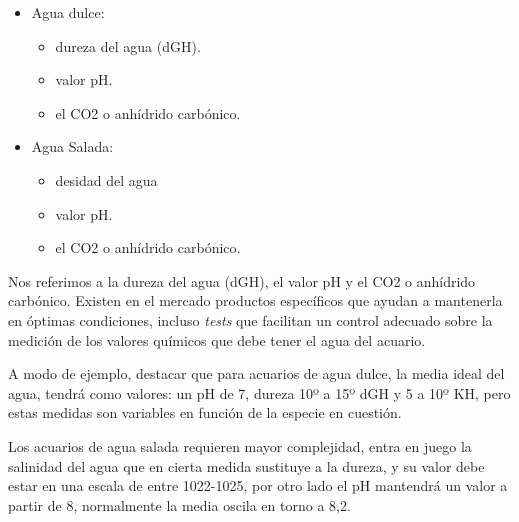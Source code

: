 \begin{itemize}
\item Agua dulce:
	\begin{itemize}
		\item dureza del agua (dGH).
		\item valor pH.
		\item el CO2  o anhídrido carbónico.
	\end{itemize}
	\vspace{5px}
	\item Agua Salada:
	\begin{itemize}
		\item desidad del agua
		\item valor pH.
		\item el CO2  o anhídrido carbónico.
	\end{itemize}
	
\end{itemize}
Nos referimos a la dureza del agua (dGH), el valor pH y el CO2  o anhídrido carbónico. Existen en el mercado productos específicos que ayudan a mantenerla en óptimas condiciones, incluso \textit{tests} que facilitan un control adecuado sobre la medición de los valores químicos que debe tener el agua del acuario.

A modo de ejemplo, destacar que para acuarios de agua dulce, la media ideal del agua, tendrá como valores: un pH de 7, dureza 10º a 15º dGH y 5 a 10º KH, pero estas medidas son variables en función de la especie en cuestión.

Los acuarios de agua salada requieren mayor complejidad, entra en juego la salinidad del agua que en cierta medida sustituye a la dureza, y su valor debe estar en una escala de entre 1022-1025, por otro lado el pH mantendrá un valor a partir de 8, normalmente la media oscila en torno a 8,2.

%
%



